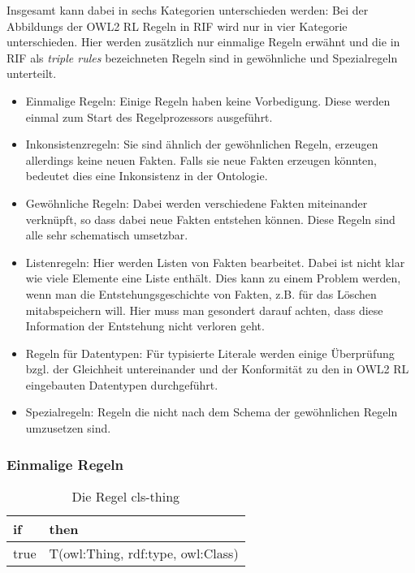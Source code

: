 Insgesamt kann dabei in sechs Kategorien unterschieden werden:
Bei der Abbildungs der OWL2 RL Regeln in RIF \cite{Reynolds2009} wird nur in vier Kategorie unterschieden. Hier werden zusätzlich nur einmalige Regeln erwähnt und die in RIF als \emph{triple rules} bezeichneten Regeln sind in gewöhnliche und Spezialregeln unterteilt.
\begin{itemize}
  \item Einmalige Regeln: Einige Regeln haben keine Vorbedigung. Diese werden einmal zum Start des Regelprozessors ausgeführt.
  \item Inkonsistenzregeln: Sie sind ähnlich der gewöhnlichen Regeln, erzeugen allerdings keine neuen Fakten. Falls sie neue Fakten erzeugen könnten, bedeutet dies eine Inkonsistenz in der Ontologie.
  \item Gewöhnliche Regeln: Dabei werden verschiedene Fakten miteinander verknüpft, so dass dabei neue Fakten entstehen können. Diese Regeln sind alle sehr schematisch umsetzbar.
  \item Listenregeln: Hier werden Listen von Fakten bearbeitet. Dabei ist nicht klar wie viele Elemente eine Liste enthält. Dies kann zu einem Problem werden, wenn man die Entstehungsgeschichte von Fakten, z.B. für das Löschen mitabspeichern will. Hier muss man gesondert darauf achten, dass diese Information der Entstehung nicht verloren geht.
  \item Regeln für Datentypen: Für typisierte Literale werden einige Überprüfung bzgl. der Gleichheit untereinander und der Konformität zu den in OWL2 RL eingebauten Datentypen durchgeführt.
  \item Spezialregeln: Regeln die nicht nach dem Schema der gewöhnlichen Regeln umzusetzen sind.

\end{itemize}

\subsubsection{Einmalige Regeln}

\begin{table}[htb]
\begin{center}
	\begin{tabular}{l|l}
	if & then \\ \hline
	true & T(owl:Thing, rdf:type, owl:Class)
	\end{tabular}
\end{center}
	\caption{Die Regel cls-thing}
	\label{rule-cls-thing}
\end{table}


